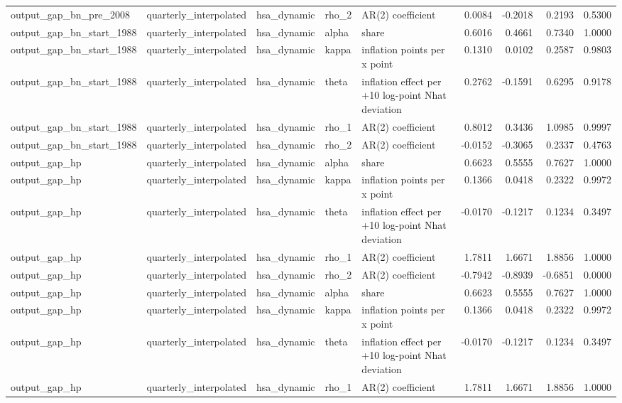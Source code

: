 \begin{tabular}{lllllrrrr}
output\_gap\_bn\_pre\_2008 & quarterly\_interpolated & hsa\_dynamic & rho\_2 & AR(2) coefficient & 0.0084 & -0.2018 & 0.2193 & 0.5300 \\
output\_gap\_bn\_start\_1988 & quarterly\_interpolated & hsa\_dynamic & alpha & share & 0.6016 & 0.4661 & 0.7340 & 1.0000 \\
output\_gap\_bn\_start\_1988 & quarterly\_interpolated & hsa\_dynamic & kappa & inflation points per x point & 0.1310 & 0.0102 & 0.2587 & 0.9803 \\
output\_gap\_bn\_start\_1988 & quarterly\_interpolated & hsa\_dynamic & theta & inflation effect per +10 log-point Nhat deviation & 0.2762 & -0.1591 & 0.6295 & 0.9178 \\
output\_gap\_bn\_start\_1988 & quarterly\_interpolated & hsa\_dynamic & rho\_1 & AR(2) coefficient & 0.8012 & 0.3436 & 1.0985 & 0.9997 \\
output\_gap\_bn\_start\_1988 & quarterly\_interpolated & hsa\_dynamic & rho\_2 & AR(2) coefficient & -0.0152 & -0.3065 & 0.2337 & 0.4763 \\
output\_gap\_hp & quarterly\_interpolated & hsa\_dynamic & alpha & share & 0.6623 & 0.5555 & 0.7627 & 1.0000 \\
output\_gap\_hp & quarterly\_interpolated & hsa\_dynamic & kappa & inflation points per x point & 0.1366 & 0.0418 & 0.2322 & 0.9972 \\
output\_gap\_hp & quarterly\_interpolated & hsa\_dynamic & theta & inflation effect per +10 log-point Nhat deviation & -0.0170 & -0.1217 & 0.1234 & 0.3497 \\
output\_gap\_hp & quarterly\_interpolated & hsa\_dynamic & rho\_1 & AR(2) coefficient & 1.7811 & 1.6671 & 1.8856 & 1.0000 \\
output\_gap\_hp & quarterly\_interpolated & hsa\_dynamic & rho\_2 & AR(2) coefficient & -0.7942 & -0.8939 & -0.6851 & 0.0000 \\
output\_gap\_hp & quarterly\_interpolated & hsa\_dynamic & alpha & share & 0.6623 & 0.5555 & 0.7627 & 1.0000 \\
output\_gap\_hp & quarterly\_interpolated & hsa\_dynamic & kappa & inflation points per x point & 0.1366 & 0.0418 & 0.2322 & 0.9972 \\
output\_gap\_hp & quarterly\_interpolated & hsa\_dynamic & theta & inflation effect per +10 log-point Nhat deviation & -0.0170 & -0.1217 & 0.1234 & 0.3497 \\
output\_gap\_hp & quarterly\_interpolated & hsa\_dynamic & rho\_1 & AR(2) coefficient & 1.7811 & 1.6671 & 1.8856 & 1.0000 \\

\end{tabular}
